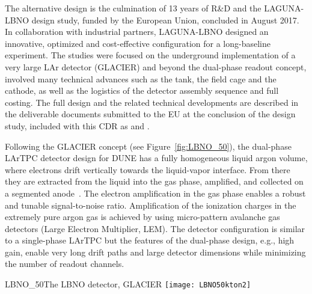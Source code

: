 The alternative design is the %
culmination of 13 years of R\&D and %
the LAGUNA-LBNO design study, funded by the European Union, 
concluded in August 2017.  In collaboration with industrial partners,
LAGUNA-LBNO designed an innovative, optimized and cost-effective configuration for
a long-baseline experiment. 
%
The studies  were focused on the underground
implementation of a very large LAr detector (GLACIER) and
beyond the dual-phase readout concept, involved many technical advances
such as the tank, the field cage and the cathode, as well as the logistics of 
the detector assembly sequence and full costing. The full design and
the related technical developments are described in the deliverable
documents submitted to the EU at the conclusion of the design study,
included with this CDR as \anxlbnoa and \anxlbnob.


Following the GLACIER concept \cite{LAGUNA-LBNO-deliv} (see
Figure~\ref{fig:LBNO_50}), 
the dual-phase LArTPC detector design for DUNE has a fully
homogeneous liquid argon volume, where electrons drift vertically
towards the liquid-vapor interface. From there they are extracted from
the liquid into the gas phase, amplified, and collected on a segmented
anode~\cite{Badertscher:2013wm,Badertscher:2012dq,Badertscher:2010zg}. The
electron amplification in the gas phase enables a robust and tunable
signal-to-noise ratio. Amplification of the ionization charges in the
extremely pure argon gas is achieved by using micro-pattern avalanche
gas detectors (Large Electron Multiplier, LEM). The detector
configuration is similar to a single-phase LArTPC but the features  of
the dual-phase design, e.g., high gain, enable very long drift paths and large detector
dimensions while minimizing the number of readout channels.

\begin{cdrfigure}{LBNO_50}{The  LBNO detector, GLACIER}
\texttt{[image: LBNO50kton2]}
\end{cdrfigure}

